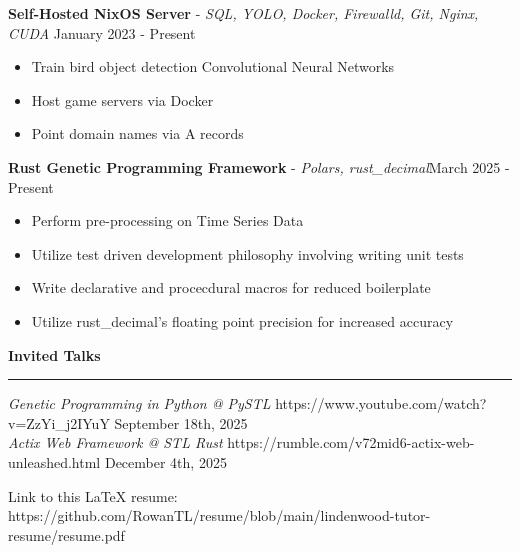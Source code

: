 \documentclass[11pt]{article}
\begin{document}
\textbf{Self-Hosted NixOS Server} - \textsl{SQL, YOLO, Docker, Firewalld, Git, Nginx, CUDA} \hfill January 2023 - Present
\begin{itemize}[noitemsep, topsep=0pt, partopsep=0pt, parsep=0pt, itemsep=0pt]
    \small
    \item Train bird object detection Convolutional Neural Networks
    \item Host game servers via Docker
    \item Point domain names via A records
\end{itemize}

\textbf{Rust Genetic Programming Framework} - \textsl{Polars, rust\_decimal}\hfill March 2025 - Present
\begin{itemize}[noitemsep, topsep=0pt, partopsep=0pt, parsep=0pt, itemsep=0pt]
    \small
    \item Perform pre-processing on Time Series Data
    \item Utilize test driven development philosophy involving writing unit tests
    \item Write declarative and procecdural macros for reduced boilerplate
    \item Utilize rust\_decimal's floating point precision for increased accuracy
\end{itemize}

\textbf{Invited Talks}\par
\vspace{-12pt}
\noindent\rule{\textwidth}{0.4pt}

\textsl{Genetic Programming in Python @ PySTL} \tiny{https://www.youtube.com/watch?v=ZzYi\_j2IYuY} \hfill \normalsize{September 18th, 2025}\\
\textsl{Actix Web Framework @ STL Rust} \tiny{https://rumble.com/v72mid6-actix-web-unleashed.html} \hfill \normalsize{December 4th, 2025}


\begin{center}
    \tiny{Link to this LaTeX resume: https://github.com/RowanTL/resume/blob/main/lindenwood-tutor-resume/resume.pdf}
\end{center}
\end{document}
